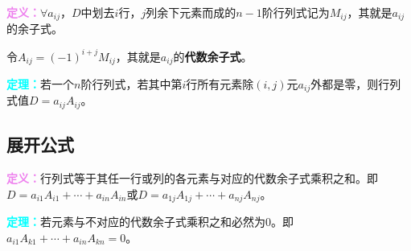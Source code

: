 \documentclass[UTF8, 12pt]{ctexart}
\begin{document}
\textcolor{violet}{\textbf{定义：}}$\forall a_{ij}$，$D$中划去$i$行，$j$列余下元素而成的$n-1$阶行列式记为$M_{ij}$，其就是$a_{ij}$的余子式。

令$A_{ij}=(-1)^{i+j}M_{ij}$，其就是$a_{ij}$的\textbf{代数余子式}。

\textcolor{aqua}{\textbf{定理：}}若一个$n$阶行列式，若其中第$i$行所有元素除$(i,j)$元$a_{ij}$外都是零，则行列式值$D=a_{ij}A_{ij}$。

\subsection{展开公式}

\textcolor{violet}{\textbf{定义：}}行列式等于其任一行或列的各元素与对应的代数余子式乘积之和。即$D=a_{i1}A_{i1}+\cdots+a_{in}A_{in}$或$D=a_{1j}A_{1j}+\cdots+a_{nj}A_{nj}$。

\textcolor{aqua}{\textbf{定理：}}若元素与不对应的代数余子式乘积之和必然为0。即$a_{i1}A_{k1}+\cdots+a_{in}A_{kn}=0$。
\end{document}
